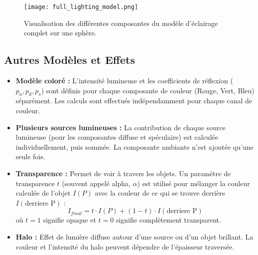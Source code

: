 \begin{figure}[H]
\centering
\texttt{[image: full\_lighting\_model.png]}
\caption{Visualisation des différentes composantes du modèle d'éclairage complet sur une sphère.}
\label{fig:full_lighting_model}
\end{figure}
\subsection{Autres Modèles et Effets}
\begin{itemize}
    \item \textbf{Modèle coloré :} L'intensité lumineuse et les coefficients de réflexion (\(p_a, p_d, p_s\)) sont définis pour chaque composante de couleur (Rouge, Vert, Bleu) séparément. Les calculs sont effectués indépendamment pour chaque canal de couleur.
    \item \textbf{Plusieurs sources lumineuses :} La contribution de chaque source lumineuse (pour les composantes diffuse et spéculaire) est calculée individuellement, puis sommée. La composante ambiante n'est ajoutée qu'une seule fois.
    \item \textbf{Transparence :} Permet de voir à travers les objets. Un paramètre de transparence \(t\) (souvent appelé alpha, \(\alpha\)) est utilisé pour mélanger la couleur calculée de l'objet \(I(P)\) avec la couleur de ce qui se trouve derrière \(I(\text{derriere P})\) :
    \[ I_{final} = t \cdot I(P) + (1-t) \cdot I(\text{derriere P}) \]
    où \(t=1\) signifie opaque et \(t=0\) signifie complètement transparent.
    \item \textbf{Halo :} Effet de lumière diffuse autour d'une source ou d'un objet brillant. La couleur et l'intensité du halo peuvent dépendre de l'épaisseur traversée.
\end{itemize}
